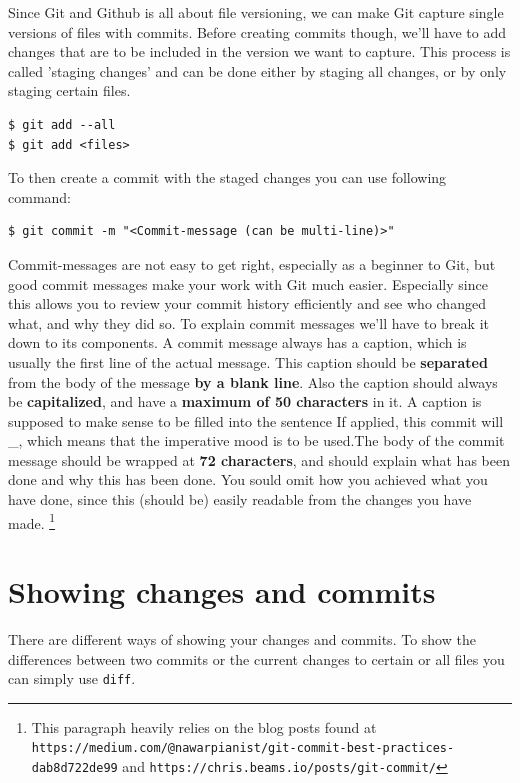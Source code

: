 \documentclass[a4paper, 12pt]{article}
\begin{document}
		Since Git and Github is all about file versioning, we can make Git capture single versions of files with commits. Before creating commits though, we'll have to add changes that are to be included in the version we want to capture. This process is called 'staging changes' and can be done either by staging all changes, or by only staging certain files.
		
		\begin{lstlisting}
$ git add --all
$ git add <files>
		\end{lstlisting}
		
		To then create a commit with the staged changes you can use following command:
		
		\begin{lstlisting}
$ git commit -m "<Commit-message (can be multi-line)>"
		\end{lstlisting}
		
		Commit-messages are not easy to get right, especially as a beginner to Git, but good commit messages make your work with Git much easier. Especially since this allows you to review your commit history efficiently and see who changed what, and why they did so. To explain commit messages we'll have to break it down to its components. A commit message always has a caption, which is usually the first line of the actual message. This caption should be \textbf{separated} from the body of the message \textbf{by a blank line}. Also the caption should always be \textbf{capitalized}, and have a \textbf{maximum of 50 characters} in it. A caption is supposed to make sense to be filled into the sentence \glqq If applied, this commit will \_\grqq, which means that the imperative mood is to be used.The body of the commit message should be wrapped at \textbf{72 characters}, and should explain what has been done and why this has been done. You sould omit how you achieved what you have done, since this (should be) easily readable from the changes you have made. \footnote{This paragraph heavily relies on the blog posts found at \lstinline|https://medium.com/@nawarpianist/git-commit-best-practices-dab8d722de99| and \lstinline|https://chris.beams.io/posts/git-commit/|}
		
	\section{Showing changes and commits}
		
		There are different ways of showing your changes and commits. To show the differences between two commits or the current changes to certain or all files you can simply use \lstinline|diff|.
		
\end{document}
